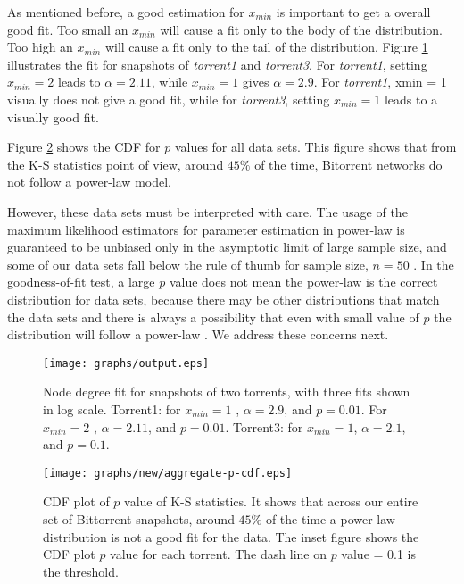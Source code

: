 \documentclass[paper]{ieice}
\begin{document}
As mentioned before, a good estimation for $x_{min}$ is important to get a overall good fit.
Too small an $x_{min}$ will cause a fit only to the body of the distribution.
Too high an $x_{min}$ will cause a fit only to the tail of the distribution.
Figure  \ref{fig:fitting} illustrates the fit for snapshots of \emph{torrent1} and \emph{torrent3}.
For \emph{torrent1}, setting $x_{min}=2$  leads to  $\alpha=2.11$, while $x_{min}=1$ gives $\alpha=2.9$.
For \emph{torrent1}, xmin = 1 visually does not give a good fit, while for  \emph{torrent3}, setting $x_{min}=1$ leads to a visually good fit.

Figure  \ref{fig:cdf-p} shows the CDF for $p$ values for all data sets. 
This figure shows that from the K-S statistics point of view, around $45\%$ of the time, Bitorrent networks do not follow a power-law model.

However, these data sets must be interpreted with care. 
The usage of the maximum likelihood estimators for parameter estimation in power-law is guaranteed to be unbiased only in the asymptotic limit of large sample size, and some of our data sets fall below the rule of thumb for sample size, $n=50$ \cite{clauset2009power}. 
In the goodness-of-fit test, a large $p$ value does not mean the power-law  is the correct distribution for data sets, because there may be other distributions that match the data sets and there is always a possibility that even with small value of $p$ the distribution will follow a power-law \cite{clauset2009power}. 
We address these concerns next.

\begin{figure}[tb]
\begin{center}
\texttt{[image: graphs/output.eps]}
\end{center}
\caption{Node degree fit for snapshots of two torrents, with three fits shown in log scale. Torrent1: for $x_{min}=1$ , $\alpha = 2.9$, and $p=0.01$. For $x_{min}=2$ , $\alpha = 2.11$, and $p = 0.01$. Torrent3: for $x_{min}=1$, $\alpha = 2.1$, and $p = 0.1$. }
\label{fig:fitting}
\end{figure}

\begin{figure}[tb]
\begin{center}
\texttt{[image: graphs/new/aggregate-p-cdf.eps]}
\end{center}
\caption{CDF plot of $p$ value of K-S statistics. It shows that across our entire set of Bittorrent snapshots, around $45\%$ of the time a power-law distribution is not a good fit for the data. 
The inset figure shows the CDF plot $p$ value for each torrent. The dash line on $p$ value = 0.1 is the threshold.} 
\label{fig:cdf-p}
\end{figure}
\end{document}

